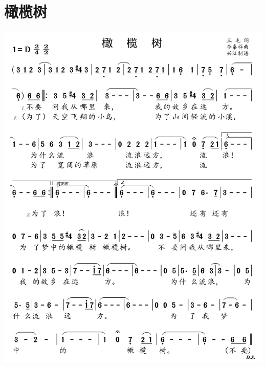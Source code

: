 \documentclass[cn,pad,twocol]{elegantbook}
\begin{document}
\section{橄榄树} \includegraphics[width=\textwidth]{rpi400/20210206橄榄树.png}
\end{document}
